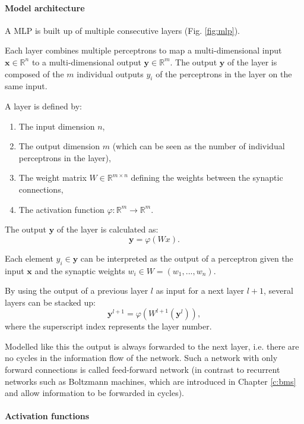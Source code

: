 \paragraph{Model architecture} \label{c:mlparch}

A MLP is built up of multiple consecutive layers (Fig. \ref{fig:mlp}).

Each layer combines multiple perceptrons to map a multi-dimensional input $\textbf{x} \in \mathbb{R}^n$ to a multi-dimensional output $\textbf{y} \in \mathbb{R}^m$.
The output $\textbf{y}$ of the layer is composed of the $m$ individual outputs $y_i$ of the perceptrons in the layer on the same input.


A layer is defined by:
\begin{enumerate}
	\item The input dimension $n$,
	\item The output dimension $m$ (which can be seen as the number of individual perceptrons in the layer),
	\item The weight matrix $W \in \mathbb{R}^{m\times n} $ defining the weights between the synaptic connections,
	\item The activation function $\varphi : \mathbb{R}^m \rightarrow \mathbb{R}^m $.
\end{enumerate}

The output $\textbf{y}$ of the layer is calculated as:
\[
\textbf{y} = \varphi(W x).
\]

Each element $y_i \in \textbf{y}$ can be interpreted as the output of a perceptron given the input $\textbf{x}$ and the synaptic weights $w_i \in W = (w_1, ... , w_n)$.

By using the output of a previous layer $l$ as input for a next layer $l+1$, several layers can be stacked up: 
\[
\textbf{y}^{l+1} = \varphi ( W^{l+1} (\textbf{y}^{l})) ,
\]
where the superscript index represents the layer number. 

Modelled like this the output is always forwarded to the next layer, i.e. there are no cycles in the information flow of the network.
Such a network with only forward connections is called feed-forward network (in contrast to recurrent networks such as Boltzmann machines, which are introduced in Chapter \ref{c:bms} and allow information to be forwarded in cycles).


\paragraph{Activation functions} \label{c:mlpact}

